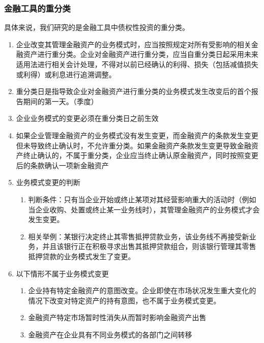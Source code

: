 \documentclass[UTF8,12pt]{ctexart}
\numberwithin{equation}{section} %
\numberwithin{figure}{section}
\numberwithin{table}{section}
\begin{document}
	
	\subsubsection{金融工具的重分类}
	具体来说，我们研究的是金融工具中债权性投资的重分类。
	
	\begin{enumerate}
		\item 企业改变其管理金融资产的业务模式时，应当按照规定对所有受影响的相关金融资产进行重分类。企业对金融资产进行重分类，应当自重分类日起采用未来适用法进行相关会计处理，不得对以前已经确认的利得、损失（包括减值损失或利得）或利息进行追溯调整。
		
		\item 重分类日是指导致企业对金融资产进行重分类的业务模式发生改变后的首个报告期间的第一天。（季度）
		
		\item 企业业务模式的变更必须在重分类日之前生效
		
		\item 如果企业管理金融资产的业务模式没有发生变更，而金融资产的条款发生变更但未导致终止确认时，不允许重分类。如果金融资产条款发生变更导致金融资产终止确认的，不属于重分类，企业应当终止确认原金融资产，同时按照变更后的条款确认一项新金融资产
		
		\item 业务模式变更的判断
		\begin{enumerate}
			\item 判断条件：只有当企业开始或终止某项对其经营影响重大的活动时（例如当企业收购、处置或终止某一业务线时），其管理金融资产的业务模式才会发生变更。
			
			\item 相关举例：某银行决定终止其零售抵押贷款业务，该业务线不再接受新业务，并且该银行正在积极寻求出售其抵押贷款组合，则该银行管理其零售抵押贷款的业务模式发生了变更。
		\end{enumerate}
	
		\item 以下情形不属于业务模式变更
		\begin{enumerate}
			\item 企业持有特定金融资产的意图改变。企业即使在市场状况发生重大变化的情况下改变对特定资产的持有意图，也不属于业务模式变更。
			
			\item 金融资产特定市场暂时性消失从而暂时影响金融资产出售
			
			\item 金融资产在企业具有不同业务模式的各部门之间转移
		\end{enumerate}
	\end{enumerate}
	
\end{document}
